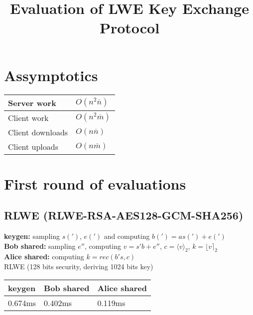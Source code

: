 \documentclass[12pt]{article}
\newcommand{\nbar}{\overline{n}}
\newcommand{\mbar}{\overline{m}}
\begin{document}
\title{Evaluation of LWE Key Exchange Protocol}
\maketitle

\section{Assymptotics}
\begin{center}
    \begin{tabular}{| l | l |}
    \hline
Server work & $O(n^2\nbar)$\\ \hline
Client work & $O(n^2\mbar)$\\ \hline
Client downloads & $O(n \nbar)$\\ \hline
Client uploads & $O(n \mbar)$\\ \hline
    \end{tabular}
\end{center}

\section{First round of evaluations}
\subsection{RLWE \tiny{(RLWE-RSA-AES128-GCM-SHA256)}}

\footnotesize{\textbf{keygen:} sampling $s(')$, $e(')$ and computing $b(') = as(') + e(')$\\
\textbf{Bob shared:} sampling $e''$, computing $v = s'b + e''$, $c = \langle v \rangle_2$, $k = \lfloor v \rceil_2$\\
\textbf{Alice shared:} computing $k = rec(b's, c)$}\\

RLWE (128 bits security, deriving 1024 bits key)
\begin{center}
    \begin{tabular}{| l | l | l |}
    \hline
    keygen & Bob shared & Alice shared \\ \hline
    0.674ms & 0.402ms & 0.119ms  \\ \hline
    \end{tabular}
\end{center}
\end{document}
